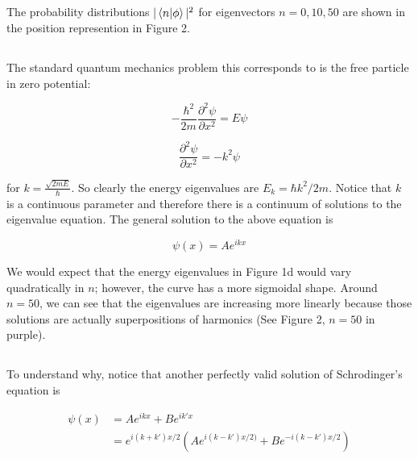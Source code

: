 \documentclass[%
 reprint,
 amsmath,amssymb,
 aps,
]{revtex4-2}
\begin{document}
\subsection{}

The probability distributions $|\bra{n}\ket{\phi}|^{2}$ for eigenvectors $n = 0, 10, 50$ are shown in the position represention in Figure 2.

\subsection{}

The standard quantum mechanics problem this corresponds to is the free particle in zero potential:

\begin{equation*}
-\frac{\hbar^{2}}{2m}\frac{\partial^{2}\psi}{\partial x^{2}} = E\psi
\end{equation*}

\begin{equation*}
\frac{\partial^{2}\psi}{\partial x^{2}} = -k^{2}\psi
\end{equation*}

for $k = \frac{\sqrt{2mE}}{\hbar}$. So clearly the energy eigenvalues are $E_{k} = \hbar k^{2}/2m$. Notice that $k$ is a continuous parameter and therefore there is a continuum of solutions to the eigenvalue equation. The general solution to the above equation is

\begin{equation*}
\psi(x) = Ae^{ikx}
\end{equation*}

We would expect that the energy eigenvalues in Figure 1d would vary quadratically in $n$; however, the curve has a more sigmoidal shape. Around $n=50$, we can see that the eigenvalues are increasing more linearly because those solutions are actually superpositions of harmonics (See Figure 2, $n=50$ in purple). 

\subsection{}

To understand why, notice that another perfectly valid solution of Schrodinger's equation is


\begin{align*}
\psi(x) &= Ae^{ikx} + Be^{ik'x} \\
&= e^{i(k+k')x/2}\left(Ae^{i(k-k')x/2)} + Be^{-i(k-k')x/2}\right)
\end{align*}
\end{document}
